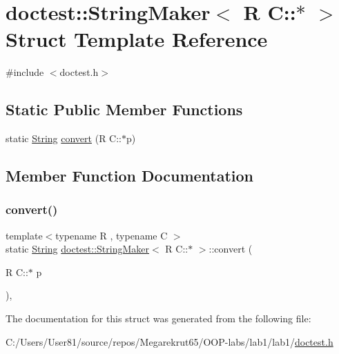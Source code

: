 \hypertarget{structdoctest_1_1_string_maker_3_01_r_01_c_1_1_5_01_4}{}\section{doctest\+:\+:String\+Maker$<$ R C\+:\+:$\ast$ $>$ Struct Template Reference}
\label{structdoctest_1_1_string_maker_3_01_r_01_c_1_1_5_01_4}


{\ttfamily \#include $<$doctest.\+h$>$}

\subsection*{Static Public Member Functions}
\begin{DoxyCompactItemize}
\item 
static \mbox{\hyperlink{classdoctest_1_1_string}{String}} \mbox{\hyperlink{structdoctest_1_1_string_maker_3_01_r_01_c_1_1_5_01_4_a06144903aacd73ed31c2fb043be8abb0}{convert}} (R C\+::$\ast$p)
\end{DoxyCompactItemize}


\subsection{Member Function Documentation}
\mbox{\label{structdoctest_1_1_string_maker_3_01_r_01_c_1_1_5_01_4_a06144903aacd73ed31c2fb043be8abb0}} 
\subsubsection{\texorpdfstring{convert()}{convert()}}
{\footnotesize\ttfamily template$<$typename R , typename C $>$ \\
static \mbox{\hyperlink{classdoctest_1_1_string}{String}} \mbox{\hyperlink{structdoctest_1_1_string_maker}{doctest\+::\+String\+Maker}}$<$ R C\+::$\ast$ $>$\+::convert (\begin{DoxyParamCaption}\item[{R C\+::$\ast$}]{p }\end{DoxyParamCaption})\hspace{0.3cm}{\ttfamily [inline]}, {\ttfamily [static]}}



The documentation for this struct was generated from the following file\+:\begin{DoxyCompactItemize}
\item 
C\+:/\+Users/\+User81/source/repos/\+Megarekrut65/\+O\+O\+P-\/labs/lab1/lab1/\mbox{\hyperlink{doctest_8h}{doctest.\+h}}\end{DoxyCompactItemize}
